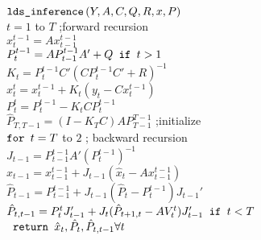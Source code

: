 \begin{algorithm}[h]
\begin{pseudocode}
\codename $\mbox{\texttt{lds\_inference}}\left(Y,A,C,Q,R,x,P\right)$\\
\codeline {} $t=1$ to $T$ ;forward recursion \\
\codeline \> $x_t^{t-1} = Ax_{t-1}^{t-1}$\\
\codeline \> $P_t^{t-1} = AP_{t-1}^{t-1}A' + Q \mbox{\texttt{ if }} t>1$\\
\codeline \> $K_t = P_t^{t-1}C'(CP_t^{t-1}C'+R)^{-1}$\\
\codeline \> $x_t^t = x_t^{t-1} + K_t(y_t - Cx_t^{t-1})$\\
\codeline \> $P_t^t = P_t^{t-1} - K_tCP_t^{t-1}$ \\
\codeline $\hat{P}_{T,T-1}=(I-K_TC)AP_{T-1}^{T-1}$ ;initialize \\
\codeline $\mbox{\texttt{for }} t=T$ to $2$ ; backward recursion \\
\codeline \> $J_{t-1} = P_{t-1}^{t-1}A'(P_t^{t-1})^{-1}$\\
\codeline \> $\hat{x}_{t-1} = x_{t-1}^{t-1} + J_{t-1}(\hat{x}_{t} - Ax_{t-1}^{t-1})$\\
\codeline \> $\hat{P}_{t-1} = P_{t-1}^{t-1} + J_{t-1}(\hat{P}_t - P_t^{t-1})J_{t-1}'$\\
\codeline \> $\hat{P}_{t,t-1} = P_t^t J_{t-1}' + J_t(\hat{P}_{t+1,t} - AV_t^t)J_{t-1}' \mbox{\texttt{ if }} t<T$\\
\codeline $\mbox{\texttt{ return }} \hat{x}_t, \hat{P}_t, \hat{P}_{t,t-1} \forall t$
\end{pseudocode}
\end{algorithm}



